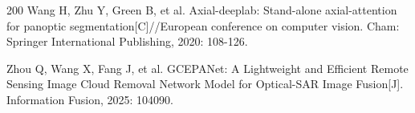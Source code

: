 \begin{thebibliography}{200}
% 
Wang H, Zhu Y, Green B, et al. Axial-deeplab: Stand-alone axial-attention for panoptic segmentation[C]//European conference on computer vision. Cham: Springer International Publishing, 2020: 108-126.



Zhou Q, Wang X, Fang J, et al. GCEPANet: A Lightweight and Efficient Remote Sensing Image Cloud Removal Network Model for Optical-SAR Image Fusion[J]. Information Fusion, 2025: 104090.

\end{thebibliography}

%
%
%
%
%





\clearpage